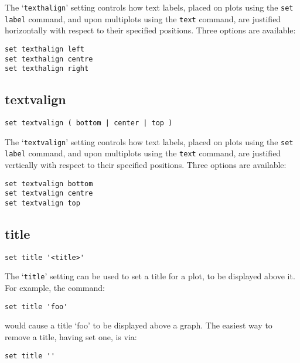 \documentclass[a4paper,onecolumn,11pt]{book}
\begin{document}
The `{\tt texthalign}' setting controls how text labels, placed on plots using the
{\tt set label} command, and upon multiplots using the {\tt text} command, are
justified horizontally with respect to their specified positions. Three options
are available:

\begin{verbatim}
set texthalign left
set texthalign centre
set texthalign right
\end{verbatim}

\subsection{textvalign}

\begin{verbatim}
set textvalign ( bottom | center | top )
\end{verbatim}

The `{\tt textvalign}' setting controls how text labels, placed on plots using the
{\tt set label} command, and upon multiplots using the {\tt text} command, are
justified vertically with respect to their specified positions. Three options
are available:

\begin{verbatim}
set textvalign bottom 
set textvalign centre
set textvalign top
\end{verbatim}

\subsection{title}

\begin{verbatim}
set title '<title>'
\end{verbatim}

The `{\tt title}' setting can be used to set a title for a plot, to be displayed
above it.  For example, the command:

\begin{verbatim}
set title 'foo'
\end{verbatim}

\noindent would cause a title `foo' to be displayed above a graph. The easiest
way to remove a title, having set one, is via:

\begin{verbatim}
set title ''
\end{verbatim}
   
\end{document}
